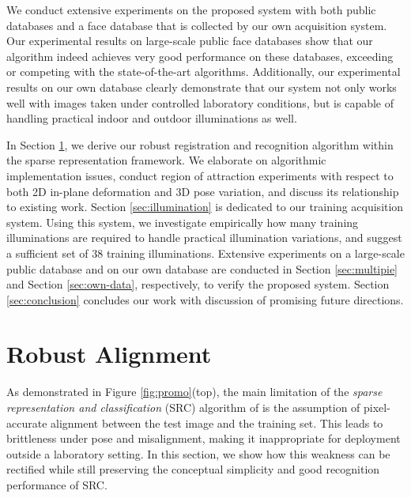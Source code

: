 \documentclass[10pt,journal,letterpaper,compsoc]{IEEEtran}
\begin{document}
We conduct extensive experiments on the proposed system with
both public databases and a face database that is collected by
our own acquisition system. Our experimental results on
large-scale public face databases show that our algorithm
indeed achieves very good performance on these databases,
exceeding or competing with the state-of-the-art algorithms.
Additionally, our experimental results on our own database
clearly demonstrate that our system not only works well with
images taken under controlled laboratory conditions, but is
capable of handling practical indoor and outdoor illuminations as well.

 In Section \ref{sec:registration},
we derive our robust registration and recognition algorithm within the sparse
representation framework. We elaborate on algorithmic implementation issues,
conduct region of attraction experiments with respect to both 2D in-plane
deformation and 3D pose variation, and discuss its relationship to existing
work. Section \ref{sec:illumination} is dedicated to our training acquisition
system. Using this system, we investigate empirically how many training
illuminations are required to handle practical illumination variations, and
suggest a sufficient set of 38 training illuminations. Extensive experiments on
a large-scale public database and on our own database are conducted in Section
\ref{sec:multipie} and Section \ref{sec:own-data}, respectively, to verify the
proposed system. Section \ref{sec:conclusion} concludes our work with
discussion of promising future directions.

\section{Robust Alignment}\label{sec:registration}
As demonstrated in Figure \ref{fig:promo}(top), the main
limitation of the {\em sparse representation and
classification} (SRC) algorithm of \cite{Wright2009-PAMI} is
the assumption of pixel-accurate alignment between the test
image and the training set. This leads to brittleness under
pose and misalignment, making it inappropriate for deployment
outside a laboratory setting. In this section, we show how this
weakness can be rectified while still preserving the conceptual
simplicity and good recognition performance of SRC.
\end{document}
